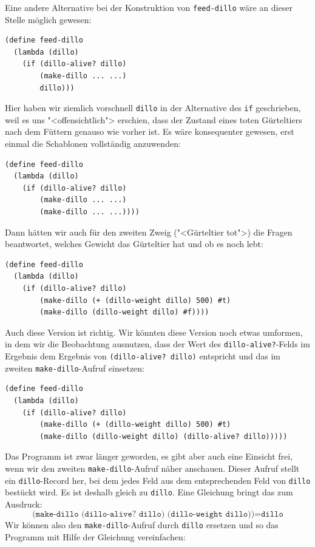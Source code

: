 Eine andere Alternative bei der Konstruktion von \texttt{feed-dillo}
wäre an dieser Stelle möglich gewesen:
%
\begin{verbatim}
(define feed-dillo
  (lambda (dillo)
    (if (dillo-alive? dillo)
        (make-dillo ... ...)
        dillo)))
\end{verbatim}
%
Hier haben wir ziemlich vorschnell \texttt{dillo} in der Alternative des
\texttt{if} geschrieben, weil es uns "<offensichtlich"> erschien, dass
der Zustand eines toten Gürteltiers nach dem Füttern genauso wie
vorher ist.  Es wäre konsequenter gewesen, erst einmal die Schablonen
vollständig anzuwenden:
%
\begin{verbatim}
(define feed-dillo
  (lambda (dillo)
    (if (dillo-alive? dillo)
        (make-dillo ... ...)
        (make-dillo ... ...))))
\end{verbatim}
%
Dann hätten wir auch für den zweiten Zweig ("<Gürteltier tot">) die Fragen beantwortet,
welches Gewicht das Gürteltier hat und ob es noch lebt:
%
\begin{verbatim}
(define feed-dillo
  (lambda (dillo)
    (if (dillo-alive? dillo)
        (make-dillo (+ (dillo-weight dillo) 500) #t)
        (make-dillo (dillo-weight dillo) #f))))
\end{verbatim}
%
Auch diese Version ist richtig.  Wir könnten diese Version noch etwas
umformen, in dem wir die Beobachtung ausnutzen, dass der Wert des
\texttt{dillo-alive?}-Felds im Ergebnis dem Ergebnis von
\texttt{(dillo-alive? dillo)} entspricht und das im zweiten
\texttt{make-dillo}-Aufruf einsetzen:
%
\begin{verbatim}
(define feed-dillo
  (lambda (dillo)
    (if (dillo-alive? dillo)
        (make-dillo (+ (dillo-weight dillo) 500) #t)
        (make-dillo (dillo-weight dillo) (dillo-alive? dillo)))))
\end{verbatim}
%
Das Programm ist zwar länger geworden, es gibt aber auch eine Einsicht
frei, wenn wir den zweiten \texttt{make-dillo}-Aufruf näher anschauen.
Dieser Aufruf stellt ein \texttt{dillo}-Record her, bei dem jedes Feld
aus dem entsprechenden Feld von \texttt{dillo} bestückt wird.  Es ist
deshalb gleich zu \texttt{dillo}.  Eine Gleichung bringt das zum Ausdruck:
%
\begin{displaymath}
  \texttt{(make-dillo (dillo-alive? dillo) (dillo-weight dillo))} = \texttt{dillo}
\end{displaymath}
%
Wir können also den \texttt{make-dillo}-Aufruf durch \texttt{dillo}
ersetzen und so das Programm mit Hilfe der Gleichung vereinfachen:
%
